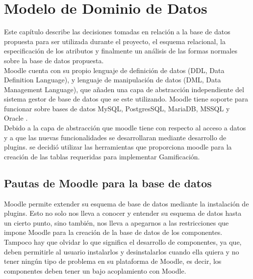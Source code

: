 \chapter{Modelo de Dominio de Datos}
\label{ch:modDominio}
\label{ch:BaseDeDatos}

Este capítulo describe las decisiones tomadas en relación a la base de datos propuesta para ser utilizada durante el proyecto, el esquema relacional, la especificación de los atributos y finalmente un análisis de las formas normales sobre la base de datos propuesta.\\

    \noindent Moodle cuenta con su propio lenguaje de definición de datos (DDL, Data Definition Language), y lenguaje de manipulación de datos (DML, Data Management Language), que añaden una capa de abstracción independiente del sistema gestor de base de datos que se este utilizando. Moodle tiene soporte para funcionar sobre bases de datos MySQL, PostgresSQL, MariaDB, MSSQL y Oracle \cite{moodleInstall}.\\

    \noindent Debido a la capa de abstracción que moodle tiene con respecto al acceso a datos y a que las nuevas funcionalidades se desarrollaran mediante desarrollo de plugins. se decidió utilizar las herramientas que proporciona moodle para la creación de las tablas requeridas para implementar Gamificación.
    
\section{Pautas de Moodle para la base de datos}
    
Moodle permite extender su esquema de base de datos mediante la instalación de plugins. Esto no solo nos lleva a conocer y entender su esquema de datos hasta un cierto punto, sino también, nos lleva a apegarnos a las restricciones que impone Moodle para la creación de la base de datos de los componentes.\\

    \noindent Tampoco hay que olvidar lo que significa el desarrollo de componentes, ya que, deben permitirle al usuario instalarlos y desinstalarlos cuando ella quiera y no tener ningún tipo de problema en su plataforma de Moodle, es decir, los componentes deben tener un bajo acoplamiento \cite[pp. 244-245]{defAcoplamiento} con Moodle.\\
    
